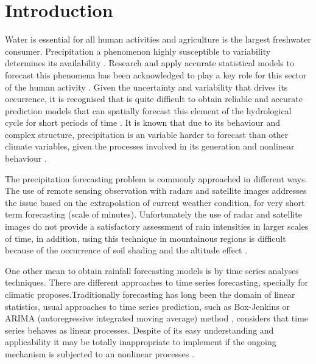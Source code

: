 \chapter{Introduction} 
\doublespacing
\label{cap:ini}
\vspace{-2cm}


Water is essential for all human activities and agriculture is the largest freshwater consumer. Precipitation a phenomenon highly susceptible to variability determines its availability \cite{calzadilla2013climate}. Research and apply accurate statistical models to forecast this phenomena has been acknowledged to play a key role for this sector of the human activity \cite{toth2000comparison}. Given the uncertainty and variability that drives its occurrence, it is recognised that is quite difficult to obtain reliable and accurate prediction models that can spatially forecast this element of the hydrological cycle for short periods of time \cite{brath1997role}. It is known that due to its behaviour and complex structure, precipitation is an variable harder to forecast than other climate variables, given the processes involved in its generation and nonlinear behaviour \cite{jha2018evaluation}.

The precipitation forecasting problem is commonly approached in different ways. The use of remote sensing observation with radars and satellite images addresses the issue based on the extrapolation of current weather condition, for very short term forecasting (scale of minutes). Unfortunately the use of radar and satellite images do not provide a satisfactory assessment of rain intensities in larger scales of time, in addition, using this technique in mountainous regions is difficult because of the occurrence of soil shading and the altitude effect \cite{toth2000comparison}. 

One other mean to obtain rainfall forecasting models is by time series analyses techniques. There are different approaches to time series forecasting, specially for climatic proposes.Traditionally forecasting has long been the domain of linear statistics, usual approaches to time series prediction, such as Box-Jenkins \citeyear{box1976time} or ARIMA (autoregressive integrated moving average) method \cite{pankratz1983forecasting}, considers that time series behaves as linear processes. Despite of its easy understanding and applicability it may be totally inappropriate to implement if the ongoing mechanism is subjected to an nonlinear processes \cite{zhang2003time}. 

